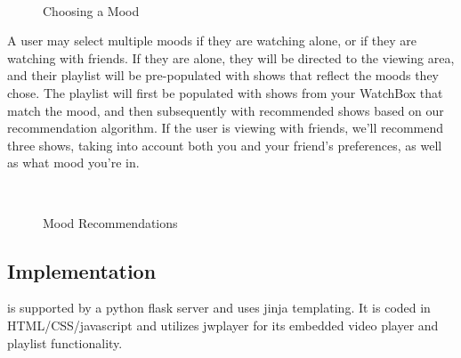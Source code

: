 \begin{figure}
\centering {}
           ~~
\caption{Choosing a Mood}
\label{fig:mood}
\end{figure}

A user may select multiple moods if they are watching alone, or if
they are watching with friends.  If they are alone, they will be
directed to the viewing area, and their playlist will be pre-populated
with shows that reflect the moods they chose.  The playlist will first
be populated with shows from your WatchBox that match the mood, and
then subsequently with recommended shows based on our recommendation
algorithm.  If the user is viewing with friends, we’ll recommend three
shows, taking into account both you and your friend’s preferences, as
well as what mood you’re in.

\begin{figure}
\centering {}
           ~~
\caption{Mood Recommendations}
\label{fig:moodrecommend}
\end{figure}

\subsection{Implementation}
{\sys} is supported by a python flask server and uses jinja
templating.  It is coded in HTML/CSS/javascript and utilizes jwplayer
for its embedded video player and playlist functionality.
